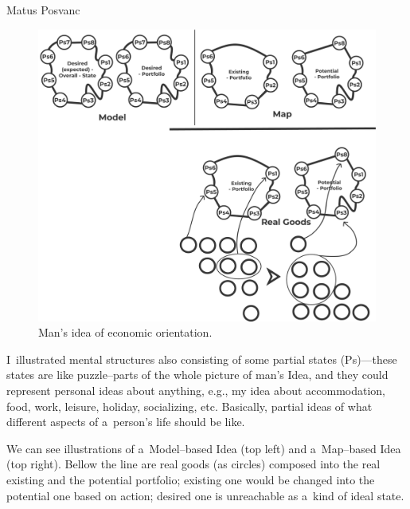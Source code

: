 \begin{artengenv}{Matus Posvanc}
\begin{figure}
 \begin{center}
 \includegraphics[width=1\textwidth]{ART_Posvanc/Illustration2_PU.pdf}%
 \end{center}%
 \caption{Man's idea of economic orientation.}\label{pos:fig2}
\end{figure}






I~illustrated mental structures also consisting of some partial states (Ps)---these states are like puzzle–parts of the whole picture of man's Idea, and they could represent personal ideas about anything, e.g., my idea about accommodation, food, work, leisure, holiday, socializing, etc. Basically, partial ideas of what different aspects of a~person's life should be like.



We can see illustrations of a~Model–based Idea (top left) and a~Map–based Idea (top right). Bellow the line are real goods (as circles) composed into the real existing and the potential portfolio; existing one would be changed into the potential one based on action; desired one is unreachable as a~kind of ideal state.




\end{artengenv}
